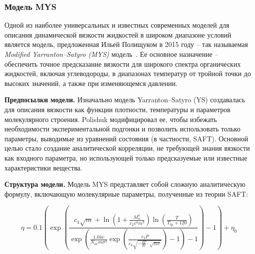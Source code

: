\documentclass[a4paper,12pt]{article}
\begin{document}
    \subsubsection{Модель MYS}

      Одной из наиболее универсальных и известных современных моделей для описания динамической вязкости жидкостей в широком диапазоне условий является модель, предложенная Ильей Полищуком в 2015 году -- так называемая \textit{Modified Yarranton–Satyro (MYS)} модель~\cite{polishuk2015viscosity}. Ее основное назначение -- обеспечить точное предсказание вязкости для широкого спектра органических жидкостей, включая углеводороды, в диапазонах температур от тройной точки до высоких значений, а также при изменяющемся давлении.

      \textbf{Предпосылки модели.}  
      Изначально модель Yarranton–Satyro (YS) создавалась для описания вязкости как функции плотности, температуры и параметров молекулярного строения. Polishuk модифицировал ее, чтобы избежать необходимости экспериментальной подгонки и позволить использовать только параметры, выводимые из уравнений состояния (в частности, SAFT). Основной целью стало создание аналитической корреляции, не требующей знания вязкости как входного параметра, но использующей только предсказуемые или известные характеристики вещества.
      
      \textbf{Структура модели.}  
      Модель MYS представляет собой сложную аналитическую формулу, включающую молекулярные параметры, полученные из теории SAFT:
      
      \begin{equation}
        \eta = 0.1 \left( \exp \left( \frac{c_1 \sqrt{m} + \ln \left( 1 + \frac{M_w^4}{c_2 v^4 m^3} \right) \ln \left( \frac{T}{T_{\text{tp}} + 120} \right)}{
        \exp \left( \frac{1.04 v}{N_{\text{av}} m \sigma^3} \exp \left( \frac{c_3 P}{\varepsilon_k \sqrt{-\frac{dP}{dv} \cdot \sqrt{m v}}} \right) - 1 \right) - 1} 
        \right) - 1 \right) + \eta_0
        \label{eq:mys}
      \end{equation}
      
\end{document}
